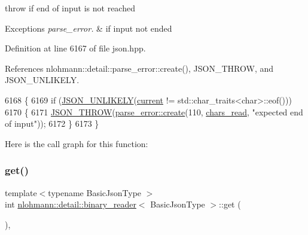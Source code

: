 throw if end of input is not reached 


\begin{DoxyExceptions}{Exceptions}
{\em parse\+\_\+error.} & if input not ended \\
\hline
\end{DoxyExceptions}


Definition at line 6167 of file json.\+hpp.



References nlohmann\+::detail\+::parse\+\_\+error\+::create(), J\+S\+O\+N\+\_\+\+T\+H\+R\+OW, and J\+S\+O\+N\+\_\+\+U\+N\+L\+I\+K\+E\+LY.


\begin{DoxyCode}
6168     \{
6169         \textcolor{keywordflow}{if} (\hyperlink{json_8hpp_ab77582407c64944e7db1ea95ab520253}{JSON\_UNLIKELY}(\hyperlink{classnlohmann_1_1detail_1_1binary__reader_a7e994e201b215cd6d6ae28a1853f43e0}{current} != std::char\_traits<char>::eof()))
6170         \{
6171             \hyperlink{json_8hpp_a6c274f6db2e65c1b66c7d41b06ad690f}{JSON\_THROW}(\hyperlink{classnlohmann_1_1detail_1_1parse__error_a9fd60ad6bce80fd99686ad332faefd37}{parse\_error::create}(110, 
      \hyperlink{classnlohmann_1_1detail_1_1binary__reader_a2dbde0b7390100efe0bfc54e21c3a34b}{chars\_read}, \textcolor{stringliteral}{"expected end of input"}));
6172         \}
6173     \}
\end{DoxyCode}
Here is the call graph for this function\+:
\mbox{\label{classnlohmann_1_1detail_1_1binary__reader_a715bbe54c5066921fcb72f0067871a72}} 
\subsubsection{\texorpdfstring{get()}{get()}}
{\footnotesize\ttfamily template$<$typename Basic\+Json\+Type $>$ \\
int \hyperlink{classnlohmann_1_1detail_1_1binary__reader}{nlohmann\+::detail\+::binary\+\_\+reader}$<$ Basic\+Json\+Type $>$\+::get (\begin{DoxyParamCaption}{ }\end{DoxyParamCaption})\hspace{0.3cm}{\ttfamily [inline]}, {\ttfamily [private]}}



